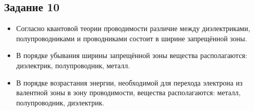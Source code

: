 \documentclass[../main.tex]{subfiles}
\begin{document}
\subsection{Задание 10}
\begin{itemize}
    \item Согласно квантовой теории проводимости различие между диэлектриками, полупроводниками и проводниками состоит в ширине запрещённой зоны.
    \item В порядке убывания ширины запрещённой зоны вещества располагаются: диэлектрик, полупроводник, металл.
    \item В порядке возрастания энергии, необходимой для перехода электрона из валентной зоны в зону проводимости, вещества располагаются: металл, полупроводник, диэлектрик.
\end{itemize}
\end{document}
